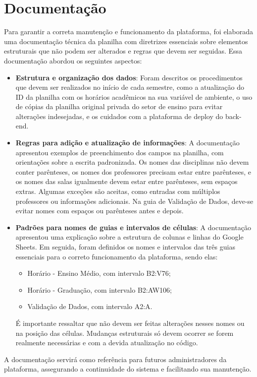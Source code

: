 \section{Documentação}

Para garantir a correta manutenção e funcionamento da plataforma, foi elaborada uma documentação técnica da planilha com diretrizes essenciais sobre elementos estruturais que não podem ser alterados e regras que devem ser seguidas. Essa documentação abordou os seguintes aspectos:

\begin{itemize}
    \item \textbf{Estrutura e organização dos dados}: Foram descritos os procedimentos que devem ser realizados no início de cada semestre, como a atualização do ID da planilha com os horários acadêmicos na sua variável de ambiente, o uso de cópias da planilha original privada do setor de ensino para evitar alterações indesejadas, e os cuidados com a plataforma de deploy do back-end.
    \item \textbf{Regras para adição e atualização de informações}: A documentação apresentou exemplos de preenchimento dos campos na planilha, com orientações sobre a escrita padronizada. Os nomes das disciplinas não devem conter parênteses, os nomes dos professores precisam estar entre parênteses, e os nomes das salas igualmente devem estar entre parênteses, sem espaços extras. Algumas exceções são aceitas, como entradas com múltiplos professores ou informações adicionais. Na guia de Validação de Dados, deve-se evitar nomes com espaços ou parênteses antes e depois.
    \item \textbf{Padrões para nomes de guias e intervalos de células}: A documentação apresentou uma explicação sobre a estrutura de colunas e linhas do Google Sheets. Em seguida, foram definidos os nomes e intervalos das três guias essenciais para o correto funcionamento da plataforma, sendo elas:
    \begin{itemize}
        \item Horário - Ensino Médio, com intervalo B2:V76;
        \item Horário - Graduação, com intervalo B2:AW106;
        \item Validação de Dados, com intervalo A2:A.
    \end{itemize}
    É importante ressaltar que não devem ser feitas alterações nesses nomes ou na posição das células. Mudanças estruturais só devem ocorrer se forem realmente necessárias e com a devida atualização no código.
\end{itemize}

A documentação servirá como referência para futuros administradores da plataforma, assegurando a continuidade do sistema e facilitando sua manutenção.